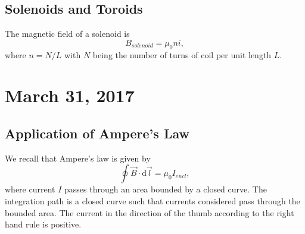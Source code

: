\documentclass[11pt]{article}
\theoremstyle{plain} %
\theoremstyle{definition}
\theoremstyle{example}
\theoremstyle{remark}
\begin{document}
\subsection{Solenoids and Toroids}
The magnetic field of a solenoid is 
$$B_{solenoid} = \mu_0ni,$$
where $n=N/L$ with $N$ being the number of turns of coil per unit length $L$.








































































\section{March 31, 2017}
\subsection{Application of Ampere's Law}

We recall that Ampere's law is given by 
$$\oint \vec B \cdot \mathrm d \vec l = \mu_0I_{encl},$$
where current $I$ passes through an area bounded by a closed curve. 
The integration path is a closed curve such that currents considered pass through the bounded area. The current in the direction of the thumb according to the right hand rule is positive.
\end{document}
